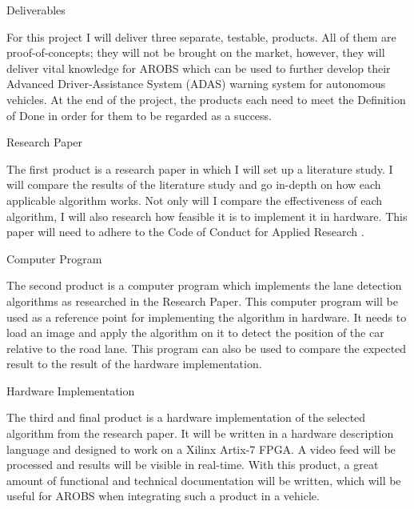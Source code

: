 \documentclass{matthijs}
\begin{document}
	\begin{hoofdstuk}{Deliverables}

		For this project I will deliver three separate, testable, products.
		All of them are proof-of-concepts; they will not be brought on the market, however, they will deliver vital knowledge for AROBS which can be used to further develop their Advanced Driver-Assistance System (ADAS) warning system for autonomous vehicles.
		At the end of the project, the products each need to meet the Definition of Done in order for them to be regarded as a success.

		\begin{paragraaf}{Research Paper}
		
			The first product is a research paper in which I will set up a literature study.
			I will compare the results of the literature study and go in-depth on how each applicable algorithm works.
			Not only will I compare the effectiveness of each algorithm, I will also research how feasible it is to implement it in hardware.
			This paper will need to adhere to the Code of Conduct for Applied Research \cite{andriessen2010gedragscode}.
		
		\end{paragraaf}

		\begin{paragraaf}{Computer Program}
		
			The second product is a computer program which implements the lane detection algorithms as researched in the Research Paper.
			This computer program will be used as a reference point for implementing the algorithm in hardware.
			It needs to load an image and apply the algorithm on it to detect the position of the car relative to the road lane.
			This program can also be used to compare the expected result to the result of the hardware implementation.
		
		\end{paragraaf}

		\begin{paragraaf}{Hardware Implementation}
		
			The third and final product is a hardware implementation of the selected algorithm from the research paper.
			It will be written in a hardware description language and designed to work on a Xilinx Artix-7 FPGA.
			A video feed will be processed and results will be visible in real-time.
			With this product, a great amount of functional and technical documentation will be written, which will be useful for AROBS when integrating such a product in a vehicle.
		
		\end{paragraaf}
		
	\end{hoofdstuk}
\end{document}
